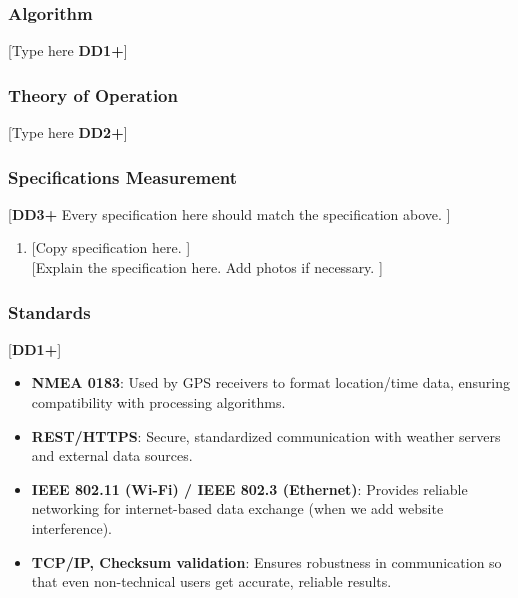 \subsubsection{Algorithm}
[Type here \textbf{DD1+}]

\subsubsection{Theory of Operation}
[Type here \textbf{DD2+}]

\subsubsection{Specifications Measurement}
[\textbf{DD3+} Every specification here should match the specification above. ]
\begin{enumerate}
    \item {[Copy specification here. ]} \\
          {[Explain the specification here. Add photos if necessary. ]}
\end{enumerate}

\subsubsection{Standards}
[\textbf{DD1+}]
\begin{itemize}
    \item \textbf{NMEA 0183}: Used by GPS receivers to format location/time data, ensuring compatibility with processing algorithms.
    \item \textbf{REST/HTTPS}: Secure, standardized communication with weather servers and external data sources.
    \item \textbf{IEEE 802.11 (Wi-Fi) / IEEE 802.3 (Ethernet)}: Provides reliable networking for internet-based data exchange (when we add website interference).
    \item \textbf{TCP/IP, Checksum validation}: Ensures robustness in communication so that even non-technical users get accurate, reliable results.
\end{itemize}